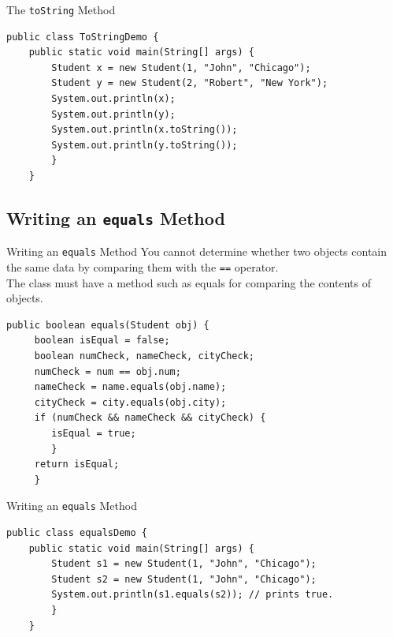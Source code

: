 \documentclass[11pt]{beamer}
\begin{document}
\begin{frame}[fragile]{The \texttt{toString} Method}
\begin{lstlisting}
public class ToStringDemo {
    public static void main(String[] args) {
        Student x = new Student(1, "John", "Chicago");
        Student y = new Student(2, "Robert", "New York");
        System.out.println(x);
        System.out.println(y);
        System.out.println(x.toString());
        System.out.println(y.toString());
        }
    }
\end{lstlisting}    
\end{frame}

\subsection{Writing an \texttt{equals} Method}
\begin{frame}[fragile]{Writing an \texttt{equals} Method}
    You cannot determine whether two objects contain the same data by comparing them with the \texttt{==} operator.  \\ \vspace{1em}
    The class must have a method such as equals for comparing the contents of objects.
    \begin{lstlisting}[basicstyle=\ttfamily\footnotesize]
 public boolean equals(Student obj) {
     boolean isEqual = false;
     boolean numCheck, nameCheck, cityCheck;
     numCheck = num == obj.num;
     nameCheck = name.equals(obj.name);
     cityCheck = city.equals(obj.city);
     if (numCheck && nameCheck && cityCheck) {
        isEqual = true; 
        }
     return isEqual;
     }
    \end{lstlisting}
\end{frame}

\begin{frame}[fragile]{Writing an \texttt{equals} Method}
\begin{lstlisting}
public class equalsDemo {
	public static void main(String[] args) {
		Student s1 = new Student(1, "John", "Chicago");
		Student s2 = new Student(1, "John", "Chicago");
		System.out.println(s1.equals(s2)); // prints true.
		}
	}
\end{lstlisting}
\end{frame}
\end{document}

